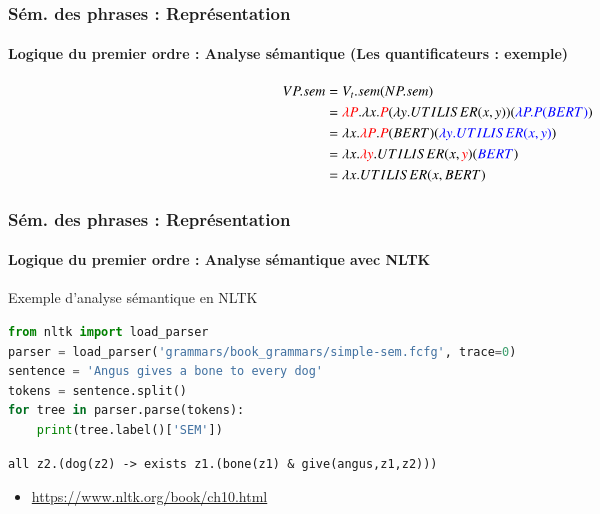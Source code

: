 \documentclass[xcolor=table]{beamer}
\begin{document}
\begin{frame}
	\frametitle{Sém. des phrases : Représentation}
	\framesubtitle{Logique du premier ordre : Analyse sémantique (Les quantificateurs : exemple)}
	
	
	\begin{center}
		\small
		\begin{align*}
		VP.sem & = V_t.sem(NP.sem) \\
		& = \textcolor{red}{\lambda P}.\lambda x.\textcolor{red}{P}(\lambda y.UTILISER(x, y))(\textcolor{blue}{\lambda P.P(BERT)}) \\
		& = \lambda x.\textcolor{red}{\lambda P}.\textcolor{red}{P}(BERT)(\textcolor{blue}{\lambda y.UTILISER(x, y)}) \\
		& = \lambda x.\textcolor{red}{\lambda y}.UTILISER(x, \textcolor{red}{y})(\textcolor{blue}{BERT}) \\
		& = \lambda x.UTILISER(x, BERT) \\
		\end{align*}
	\end{center}
	
\end{frame}

\begin{frame}[fragile]
	\frametitle{Sém. des phrases : Représentation}
	\framesubtitle{Logique du premier ordre : Analyse sémantique avec NLTK}
	
	\begin{exampleblock}{Exemple d'analyse sémantique en NLTK}
	{\scriptsize
		\begin{lstlisting}[language=Python]
from nltk import load_parser
parser = load_parser('grammars/book_grammars/simple-sem.fcfg', trace=0)
sentence = 'Angus gives a bone to every dog'
tokens = sentence.split()
for tree in parser.parse(tokens):
    print(tree.label()['SEM'])
		\end{lstlisting}
	}

	{\scriptsize\bfseries
	\begin{lstlisting}
all z2.(dog(z2) -> exists z1.(bone(z1) & give(angus,z1,z2)))
	\end{lstlisting}
	}
	
	\end{exampleblock}

	\begin{itemize}
		\item \url{https://www.nltk.org/book/ch10.html}
	\end{itemize}
	
\end{frame}
\end{document}
